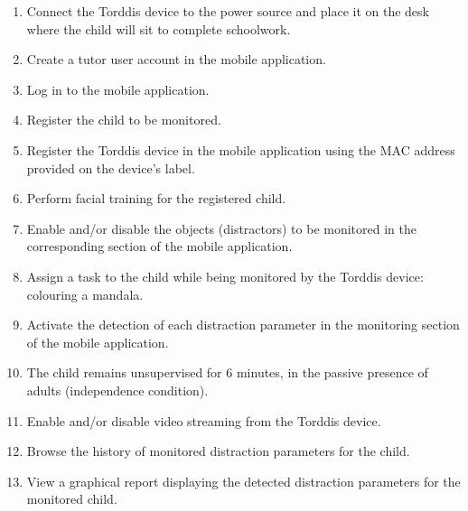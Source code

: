                 \begin{enumerate}
                    \item Connect the Torddis device to the power source and place it on the desk where the child will sit to complete schoolwork.
                    
                    \item Create a tutor user account in the mobile application.
                    
                    \item Log in to the mobile application.
                    
                    \item Register the child to be monitored.
                    
                    \item Register the Torddis device in the mobile application using the MAC address provided on the device's label.
                    
                    \item Perform facial training for the registered child.
                    
                    \item Enable and/or disable the objects (distractors) to be monitored in the corresponding section of the mobile application.
                    
                    \item Assign a task to the child while being monitored by the Torddis device: colouring a mandala.
                    
                    \item Activate the detection of each distraction parameter in the monitoring section of the mobile application.
                    
                    \item The child remains unsupervised for 6 minutes, in the passive presence of adults (independence condition).
                    
                    \item Enable and/or disable video streaming from the Torddis device.
                    
                    \item Browse the history of monitored distraction parameters for the child.
                    
                    \item View a graphical report displaying the detected distraction parameters for the monitored child.
                \end{enumerate}
                
